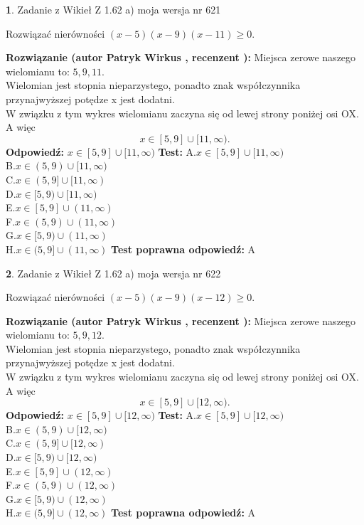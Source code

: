 \documentclass[12pt, a4paper]{article}
\theoremstyle{definition} %
\newtheorem{zad}{}
\newcommand{\zadStart}[1]{\begin{zad}#1\newline}
\newcommand{\zadStop}{\end{zad}}
\newcommand{\rozwStart}[2]{\noindent \textbf{Rozwiązanie (autor #1 , recenzent #2): }\newline}
\newcommand{\rozwStop}{\newline}
\newcommand{\odpStart}{\noindent \textbf{Odpowiedź:}\newline}
\newcommand{\odpStop}{\newline}
\newcommand{\testStart}{\noindent \textbf{Test:}\newline}
\newcommand{\testStop}{\newline}
\newcommand{\kluczStart}{\noindent \textbf{Test poprawna odpowiedź:}\newline}
\newcommand{\kluczStop}{\newline}
\begin{document}
\zadStart{Zadanie z Wikieł Z 1.62 a) moja wersja nr 621}

Rozwiązać nierówności $(x-5)(x-9)(x-11)\ge0$.
\zadStop
\rozwStart{Patryk Wirkus}{}
Miejsca zerowe naszego wielomianu to: $5, 9, 11$.\\
Wielomian jest stopnia nieparzystego, ponadto znak współczynnika przy\linebreak najwyższej potędze x jest dodatni.\\ W związku z tym wykres wielomianu zaczyna się od lewej strony poniżej osi OX. A więc $$x \in [5,9] \cup [11,\infty).$$
\rozwStop
\odpStart
$x \in [5,9] \cup [11,\infty)$
\odpStop
\testStart
A.$x \in [5,9] \cup [11,\infty)$\\
B.$x \in (5,9) \cup [11,\infty)$\\
C.$x \in (5,9] \cup [11,\infty)$\\
D.$x \in [5,9) \cup [11,\infty)$\\
E.$x \in [5,9] \cup (11,\infty)$\\
F.$x \in (5,9) \cup (11,\infty)$\\
G.$x \in [5,9) \cup (11,\infty)$\\
H.$x \in (5,9] \cup (11,\infty)$
\testStop
\kluczStart
A
\kluczStop



\zadStart{Zadanie z Wikieł Z 1.62 a) moja wersja nr 622}

Rozwiązać nierówności $(x-5)(x-9)(x-12)\ge0$.
\zadStop
\rozwStart{Patryk Wirkus}{}
Miejsca zerowe naszego wielomianu to: $5, 9, 12$.\\
Wielomian jest stopnia nieparzystego, ponadto znak współczynnika przy\linebreak najwyższej potędze x jest dodatni.\\ W związku z tym wykres wielomianu zaczyna się od lewej strony poniżej osi OX. A więc $$x \in [5,9] \cup [12,\infty).$$
\rozwStop
\odpStart
$x \in [5,9] \cup [12,\infty)$
\odpStop
\testStart
A.$x \in [5,9] \cup [12,\infty)$\\
B.$x \in (5,9) \cup [12,\infty)$\\
C.$x \in (5,9] \cup [12,\infty)$\\
D.$x \in [5,9) \cup [12,\infty)$\\
E.$x \in [5,9] \cup (12,\infty)$\\
F.$x \in (5,9) \cup (12,\infty)$\\
G.$x \in [5,9) \cup (12,\infty)$\\
H.$x \in (5,9] \cup (12,\infty)$
\testStop
\kluczStart
A
\kluczStop
\end{document}
